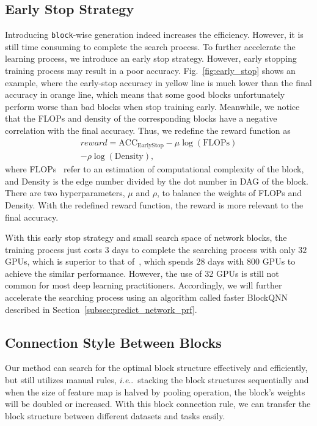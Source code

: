 \documentclass[10pt,journal,compsoc]{IEEEtran}
\makeatletter
\DeclareRobustCommand\onedot{\futurelet\@let@token\@onedot}
\def\@onedot{\ifx\@let@token.\else.\null\fi\xspace}
\def\ie{\emph{i.e}\onedot} \def\Ie{\emph{I.e}\onedot}
\makeatother
\begin{document}
\subsection{Early Stop Strategy}
\label{subsec:early_stop}




Introducing \texttt{block}-wise generation indeed increases the efficiency. However, it is still time consuming to complete the search process. To further accelerate the learning process, we introduce an early stop strategy. However, early stopping training process may result in a poor accuracy. Fig.~\ref{fig:early_stop} shows an example, where the early-stop accuracy in yellow line is much lower than the final accuracy in orange line, which means that some good blocks unfortunately perform worse than bad blocks when stop training early. Meanwhile, we notice that the FLOPs and density of the corresponding blocks have a negative correlation with the final accuracy. Thus, we redefine the reward function as 
\begin{eqnarray}
\nonumber reward = \text{ACC}_{\text{EarlyStop}} - \mu\log(\text{FLOPs})\\
- \rho\log(\text{Density}),
\label{eq:early_stop_reward}
\end{eqnarray}
where FLOPs~\cite{he2015convolutional} refer to an estimation of computational complexity of the block, and Density is the edge number divided by the dot number in DAG of the block. There are two hyperparameters, $\mu$ and $\rho$, to balance the weights of FLOPs and Density. With the redefined reward function, the reward is more relevant to the final accuracy.


With this early stop strategy and small search space of network blocks, the training process just costs $3$ days to complete the searching process with only $32$ GPUs, which is superior to that of~\cite{zoph2016neural}, which spends $28$ days with $800$ GPUs to achieve the similar performance.
However, the use of 32 GPUs is still not common for most deep learning practitioners.
Accordingly, we will further accelerate the searching process using an algorithm called faster BlockQNN described in Section~\ref{subsec:predict_network_prf}.


\subsection{Connection Style Between Blocks}
\label{subsec:block_conn}

Our method can search for the optimal block structure effectively and efficiently, but still utilizes manual rules, \ie~stacking the block structures sequentially and when the size of feature map is halved by pooling operation, the block's weights will be doubled or increased. With this block connection rule, we can transfer the block structure between different datasets and tasks easily.
\end{document}
